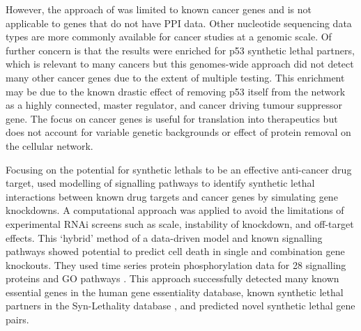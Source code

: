 However, the approach of \citet{Kranthi2013} was limited to known \glspl{cancer gene} and is not applicable to genes that do not have \gls{PPI} data. Other nucleotide sequencing data types are more commonly available for cancer studies at a \gls{genomic} scale. Of further concern is that the results were enriched for p53 \gls{synthetic lethal} partners, which is relevant to many \glspl{cancer} but this \glspl{genome}-wide approach did not detect many other \glspl{cancer gene} due to the extent of multiple testing. This enrichment may be due to the known drastic effect of removing p53 itself from the network as a highly connected, master regulator, and cancer driving \gls{tumour suppressor} gene. The focus on \glspl{cancer gene} is useful for translation into therapeutics but does not account for variable genetic backgrounds or effect of protein removal on the cellular network.  

Focusing on the potential for \glspl{synthetic lethal} to be an effective anti-cancer drug target, \citet{Zhang2015} used modelling of signalling pathways to identify \gls{synthetic lethal} interactions between known drug targets and \glspl{cancer gene} by simulating gene knockdowns. A computational approach was applied to avoid the limitations of experimental \gls{RNAi} screens such as scale, instability of knockdown, and off-target effects. This `hybrid' method of a data-driven model and known signalling pathways showed potential to predict cell death in single and combination gene knockouts. They used time series protein phosphorylation data \citep{Lee2012} for 28 signalling proteins and \gls{GO} \glspl{pathway} \citep{Ashburner2000, Blake2015}. This approach successfully detected many known \gls{essential} genes in the human gene essentiality database, known \gls{synthetic lethal} partners in the Syn-Lethality database \citep{Li2014}, and predicted novel \gls{synthetic lethal} gene pairs. %

